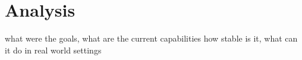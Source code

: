 \chapter{Analysis}


what were the goals, what are the current capabilities
\newline
how stable is it, what can it do in real world settings
